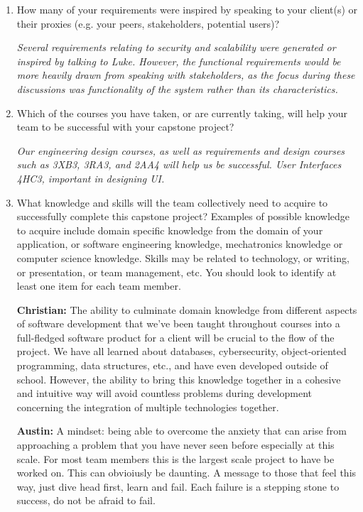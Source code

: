 \documentclass[12pt]{article}
\begin{document}
\begin{enumerate}
  \item How many of your requirements were inspired by speaking to your
  client(s) or their proxies (e.g. your peers, stakeholders, potential users)?

  \textit{Several requirements relating to security and scalability were generated or inspired by talking to Luke. However, the functional requirements would be more heavily drawn from speaking with stakeholders, as the focus during these discussions was functionality of the system rather than its characteristics.}

  \item Which of the courses you have taken, or are currently taking, will help your team to be successful with your capstone project?
  
  \textit{Our engineering design courses, as well as requirements and design courses such as 3XB3, 3RA3, and 2AA4 will help us be successful. User Interfaces 4HC3, important in designing UI.}

  \item What knowledge and skills will the team collectively need to acquire to
  successfully complete this capstone project?  Examples of possible knowledge
  to acquire include domain specific knowledge from the domain of your
  application, or software engineering knowledge, mechatronics knowledge or
  computer science knowledge.  Skills may be related to technology, or writing,
  or presentation, or team management, etc.  You should look to identify at
  least one item for each team member.

  \textbf{Christian:} The ability to culminate domain knowledge from different aspects of software development that we’ve been taught throughout courses into a full-fledged software product for a client will be crucial to the flow of the project. We have all learned about databases, cybersecurity, object-oriented programming, data structures, etc., and have even developed outside of school. However, the ability to bring this knowledge together in a cohesive and intuitive way will avoid countless problems during development concerning the integration of multiple technologies together.

  \textbf{Austin: } A mindset: being able to overcome the anxiety that can arise from approaching a problem that you have never seen before especially at this scale. For most team members this is the largest scale project to have be worked on. This can obvioiusly be daunting. A message to those that feel this way, just dive head first, learn and fail. Each failure is a stepping stone to success, do not be afraid to fail.
  

\end{enumerate}
\end{document}
